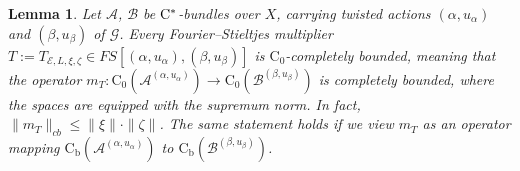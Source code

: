 \documentclass[11 pt, leqno]{amsart}
\numberwithin{equation}{section}
\theoremstyle{plain}
\newtheorem {lem} [thm]{Lemma}
\theoremstyle{definition}
\newcommand*{\nb}{\nobreakdash}
\newcommand*{\contz}{\mathrm{C_0}}%
\newcommand*{\contb}{\mathrm{C_b}}%
\newcommand{\B}{\mathcal B}
\newcommand{\m}{m}
\newcommand{\G}{\mathcal G} %
\newcommand{\EE}{\mathcal E}
\newcommand{\A}{\mathcal A}
\newcommand{\cst}{\ifmmode\mathrm{C}^*\else{$\mathrm{C}^*$}\fi}
\begin{document}
\begin{lem}\label{lem:FS_multiplier_bounded} 
Let $\A$, $\B$ be $\cst$-bundles over $X$, carrying twisted actions $(\alpha,u_\alpha)$ and $(\beta,u_\beta)$ of $\G$.
Every Fourier--Stieltjes multiplier $T:=T_{\EE,L,\xi,\zeta} \in FS[(\alpha,u_{\alpha}),(\beta,u_{\beta})]$ is  %
$\contz$\nb-completely bounded, meaning that the operator $\m_{T} : \contz(\A^{(\alpha,u_{\alpha})}) \to \contz(\B^{(\beta,u_{\beta})})$ is completely bounded, where the spaces are equipped with the supremum norm. 
In fact, $\| \m_{T} \|_{cb} \leq \|\xi\| \cdot \|\zeta\|$. 
The same statement holds if we view $\m_{T}$ as an operator mapping $\contb(\A^{(\alpha,u_{\alpha})})$ to $\contb(\B^{(\beta,u_{\beta})})$.
\end{lem}
\end{document}
